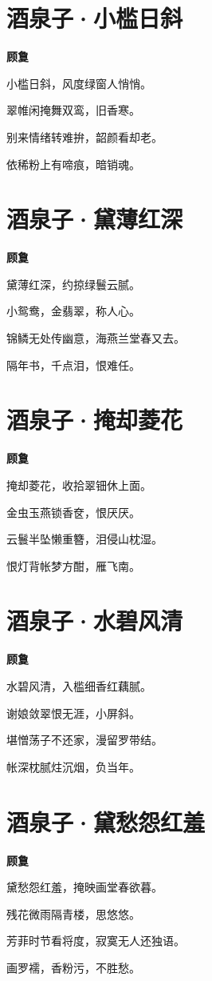 \documentclass[12pt,a4paper]{ctexbook}
\begin{document}
\section{酒泉子·小槛日斜}
\textbf{顾敻}\par\vspace{0.5em}
小槛日斜，风度绿窗人悄悄。\par
翠帷闲掩舞双鸾，旧香寒。\par
别来情绪转难拚，韶颜看却老。\par
依稀粉上有啼痕，暗销魂。\par

\section{酒泉子·黛薄红深}
\textbf{顾敻}\par\vspace{0.5em}
黛薄红深，约掠绿鬟云腻。\par
小鸳鸯，金翡翠，称人心。\par
锦鳞无处传幽意，海燕兰堂春又去。\par
隔年书，千点泪，恨难任。\par

\section{酒泉子·掩却菱花}
\textbf{顾敻}\par\vspace{0.5em}
掩却菱花，收拾翠钿休上面。\par
金虫玉燕锁香奁，恨厌厌。\par
云鬟半坠懒重簪，泪侵山枕湿。\par
恨灯背帐梦方酣，雁飞南。\par

\section{酒泉子·水碧风清}
\textbf{顾敻}\par\vspace{0.5em}
水碧风清，入槛细香红藕腻。\par
谢娘敛翠恨无涯，小屏斜。\par
堪憎荡子不还家，漫留罗带结。\par
帐深枕腻炷沉烟，负当年。\par

\section{酒泉子·黛愁怨红羞}
\textbf{顾敻}\par\vspace{0.5em}
黛愁怨红羞，掩映画堂春欲暮。\par
残花微雨隔青楼，思悠悠。\par
芳菲时节看将度，寂寞无人还独语。\par
画罗襦，香粉污，不胜愁。\par
\end{document}
